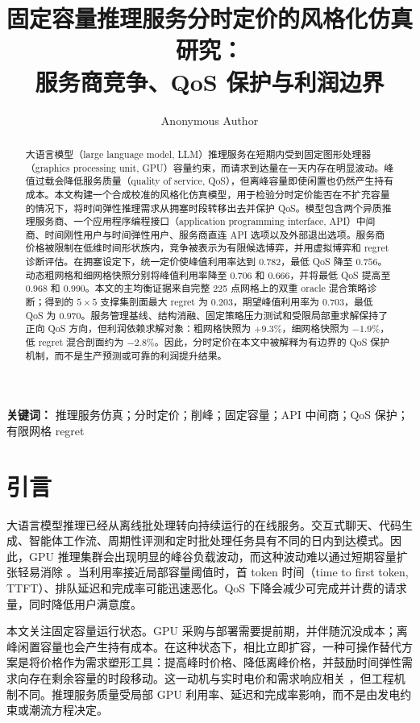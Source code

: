 \documentclass[UTF8,11pt,a4paper]{ctexart}
\title{\textbf{固定容量推理服务分时定价的风格化仿真研究：\\
服务商竞争、QoS 保护与利润边界}}
\author{Anonymous Author}
\date{}
\begin{document}
\maketitle

\begin{abstract}
大语言模型（large language model, LLM）推理服务在短期内受到固定图形处理器（graphics processing unit, GPU）容量约束，而请求到达量在一天内存在明显波动。峰值过载会降低服务质量（quality of service, QoS），但离峰容量即使闲置也仍然产生持有成本。本文构建一个合成校准的风格化仿真模型，用于检验分时定价能否在不扩充容量的情况下，将时间弹性推理需求从拥塞时段转移出去并保护 QoS。模型包含两个异质推理服务商、一个应用程序编程接口（application programming interface, API）中间商、时间刚性用户与时间弹性用户、服务商直连 API 选项以及外部退出选项。服务商价格被限制在低维时间形状族内，竞争被表示为有限候选博弈，并用虚拟博弈和 regret 诊断评估。在拥塞设定下，统一定价使峰值利用率达到 $0.782$，最低 QoS 降至 $0.756$。动态粗网格和细网格快照分别将峰值利用率降至 $0.706$ 和 $0.666$，并将最低 QoS 提高至 $0.968$ 和 $0.990$。本文的主均衡证据来自完整 225 点网格上的双重 oracle 混合策略诊断；得到的 $5\times5$ 支撑集剖面最大 regret 为 $0.203$，期望峰值利用率为 $0.703$，最低 QoS 为 $0.970$。服务管理基线、结构消融、固定策略压力测试和受限局部重求解保持了正向 QoS 方向，但利润依赖求解对象：粗网格快照为 $+9.3\%$，细网格快照为 $-1.9\%$，低 regret 混合剖面约为 $-2.8\%$。因此，分时定价在本文中被解释为有边界的 QoS 保护机制，而不是生产预测或可靠的利润提升结果。
\end{abstract}

\noindent\textbf{关键词：} 推理服务仿真；分时定价；削峰；固定容量；API 中间商；QoS 保护；有限网格 regret

\section{引言}
\label{sec:intro}

大语言模型推理已经从离线批处理转向持续运行的在线服务。交互式聊天、代码生成、智能体工作流、周期性评测和定时批处理任务具有不同的日内到达模式。因此，GPU 推理集群会出现明显的峰谷负载波动，而这种波动难以通过短期容量扩张轻易消除 \cite{crankshaw2017clipper,gujarati2020clockwork,yu2022orca,kwon2023pagedattention,agrawal2024sarathiserve}。当利用率接近局部容量阈值时，首 token 时间（time to first token, TTFT）、排队延迟和完成率可能迅速恶化。QoS 下降会减少可完成并计费的请求量，同时降低用户满意度。

本文关注固定容量运行状态。GPU 采购与部署需要提前期，并伴随沉没成本；离峰闲置容量也会产生持有成本。在这种状态下，相比立即扩容，一种可操作替代方案是将价格作为需求塑形工具：提高峰时价格、降低离峰价格，并鼓励时间弹性需求向存在剩余容量的时段移动。这一动机与实时电价和需求响应相关 \cite{schweppe1988spot,borenstein2005long,albadi2008summary,faruqui2010household,siano2014demand}，但工程机制不同。推理服务质量受局部 GPU 利用率、延迟和完成率影响，而不是由发电约束或潮流方程决定。
\end{document}
